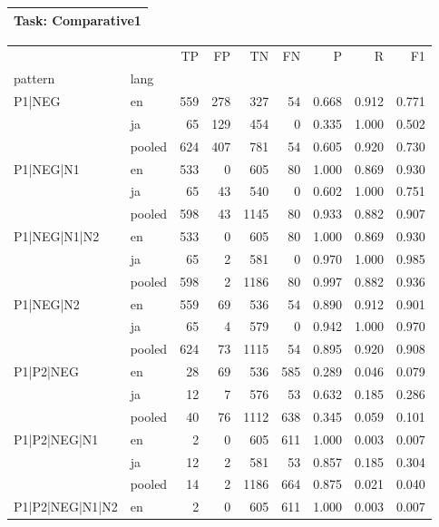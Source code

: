 
\begin{table}[h!]
\centering
\begin{tabular}{p{}}
\toprule
\textbf{Task: Comparative1} \\
\midrule
\end{tabular}
\vspace{10pt}
\begin{tabular}{llrrrrrrr}
\toprule
 &  & TP & FP & TN & FN & P & R & F1 \\
pattern & lang &  &  &  &  &  &  &  \\
\midrule
\multirow[t]{3}{*}{P1|NEG} & en & 559 & 278 & 327 & 54 & 0.668 & 0.912 & 0.771 \\
 & ja & 65 & 129 & 454 & 0 & 0.335 & 1.000 & 0.502 \\
 & pooled & 624 & 407 & 781 & 54 & 0.605 & 0.920 & 0.730 \\
\cline{1-9}
\multirow[t]{3}{*}{P1|NEG|N1} & en & 533 & 0 & 605 & 80 & 1.000 & 0.869 & 0.930 \\
 & ja & 65 & 43 & 540 & 0 & 0.602 & 1.000 & 0.751 \\
 & pooled & 598 & 43 & 1145 & 80 & 0.933 & 0.882 & 0.907 \\
\cline{1-9}
\multirow[t]{3}{*}{P1|NEG|N1|N2} & en & 533 & 0 & 605 & 80 & 1.000 & 0.869 & 0.930 \\
 & ja & 65 & 2 & 581 & 0 & 0.970 & 1.000 & 0.985 \\
 & pooled & 598 & 2 & 1186 & 80 & 0.997 & 0.882 & 0.936 \\
\cline{1-9}
\multirow[t]{3}{*}{P1|NEG|N2} & en & 559 & 69 & 536 & 54 & 0.890 & 0.912 & 0.901 \\
 & ja & 65 & 4 & 579 & 0 & 0.942 & 1.000 & 0.970 \\
 & pooled & 624 & 73 & 1115 & 54 & 0.895 & 0.920 & 0.908 \\
\cline{1-9}
\multirow[t]{3}{*}{P1|P2|NEG} & en & 28 & 69 & 536 & 585 & 0.289 & 0.046 & 0.079 \\
 & ja & 12 & 7 & 576 & 53 & 0.632 & 0.185 & 0.286 \\
 & pooled & 40 & 76 & 1112 & 638 & 0.345 & 0.059 & 0.101 \\
\cline{1-9}
\multirow[t]{3}{*}{P1|P2|NEG|N1} & en & 2 & 0 & 605 & 611 & 1.000 & 0.003 & 0.007 \\
 & ja & 12 & 2 & 581 & 53 & 0.857 & 0.185 & 0.304 \\
 & pooled & 14 & 2 & 1186 & 664 & 0.875 & 0.021 & 0.040 \\
\cline{1-9}
\multirow[t]{3}{*}{P1|P2|NEG|N1|N2} & en & 2 & 0 & 605 & 611 & 1.000 & 0.003 & 0.007 \\

\end{tabular}
\end{table}
